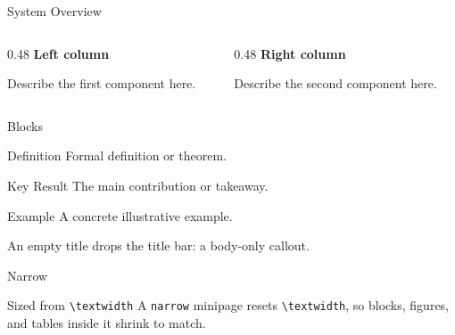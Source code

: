 \documentclass[aspectratio=169, 10pt]{beamer}
\begin{document}

\begin{frame}{System Overview}
	\begin{columns}[T]
		\begin{column}{0.48\textwidth}
			\textbf{Left column}\medskip\par
			Describe the first component here.
		\end{column}
		\begin{column}{0.48\textwidth}
			\textbf{Right column}\medskip\par
			Describe the second component here.
		\end{column}
	\end{columns}
\end{frame}

\begin{frame}{Blocks}
	\begin{block}{Definition}
		Formal definition or theorem.
	\end{block}
	\begin{alertblock}{Key Result}
		The main contribution or takeaway.
	\end{alertblock}
	\begin{exampleblock}{Example}
		A concrete illustrative example.
	\end{exampleblock}
	\begin{block}{}
		An empty title drops the title bar: a body-only callout.
	\end{block}
\end{frame}

\begin{frame}{Narrow}
	\begin{narrow}[0.6\textwidth]
		\begin{block}{Sized from \texttt{\textbackslash textwidth}}
			A \texttt{narrow} minipage resets \texttt{\textbackslash textwidth}, so blocks,
			figures, and tables inside it shrink to match.
		\end{block}
	\end{narrow}
\end{frame}
\end{document}
